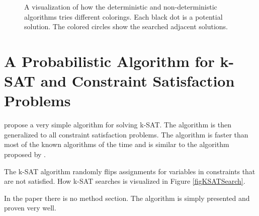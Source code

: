 \documentclass[msc,lith,english]{liuthesis}
\begin{document}
\begin{center}
\begin{figure}[h!]
\centering
{}
  \caption{A visualization of how the deterministic and non-deterministic algorithms tries different colorings. Each black dot is a potential solution. The colored circles show the searched adjacent solutions.}
  \label{figNoRainbowSearchPattern}
\end{figure}
\end{center}

\section{A Probabilistic Algorithm for k-SAT and Constraint Satisfaction Problems}
\citeauthor{sourceProbAlgo} \cite{sourceProbAlgo} propose a very simple algorithm for solving k-SAT.
The algorithm is then generalized to all constraint satisfaction problems. The
algorithm is faster than most of the known algorithms of the time and is
similar to the algorithm proposed by \citeauthor{sourceNoRainbow} \cite{sourceNoRainbow}.

The k-SAT algorithm randomly flips assignments for variables in constraints that are not satisfied.
How k-SAT searches is visualized in Figure \ref{figKSATSearch}.

In the paper there is no method section. The algorithm is simply presented and proven very well. 
\end{document}
